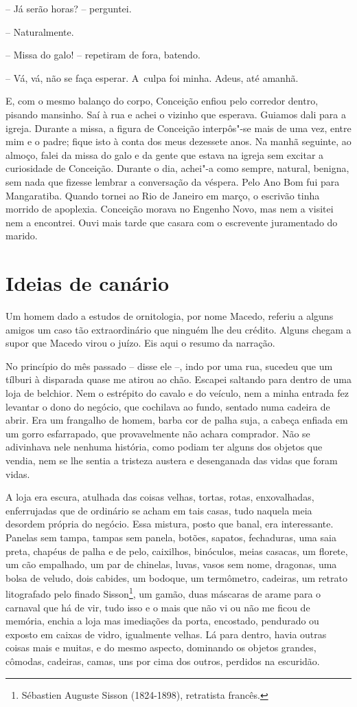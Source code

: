 -- Já serão horas? -- perguntei.

-- Naturalmente.

-- Missa do galo! -- repetiram de fora, batendo.

-- Vá, vá, não se faça esperar. A~culpa foi minha. Adeus, até amanhã.

E, com o mesmo balanço do corpo, Conceição enfiou pelo corredor dentro,
pisando mansinho. Saí à rua e achei o vizinho que esperava. Guiamos dali
para a igreja. Durante a missa, a figura de Conceição interpôs"-se mais
de uma vez, entre mim e o padre; fique isto à conta dos meus dezessete
anos. Na manhã seguinte, ao almoço, falei da missa do galo e da gente
que estava na igreja sem excitar a curiosidade de Conceição. Durante o
dia, achei"-a como sempre, natural, benigna, sem nada que fizesse lembrar
a conversação da véspera. Pelo Ano Bom fui para Mangaratiba. Quando
tornei ao Rio de Janeiro em março, o escrivão tinha morrido de
apoplexia. Conceição morava no Engenho Novo, mas nem a visitei nem a
encontrei. Ouvi mais tarde que casara com o escrevente juramentado do
marido.

\chapter{Ideias de canário}

Um homem dado a estudos de ornitologia, por nome Macedo, referiu a
alguns amigos um caso tão extraordinário que ninguém lhe deu crédito.
Alguns chegam a supor que Macedo virou o juízo. Eis aqui o resumo da
narração.

No princípio do mês passado -- disse ele --, indo por uma rua, sucedeu
que um tílburi à disparada quase me atirou ao chão. Escapei saltando
para dentro de uma loja de belchior. Nem o estrépito do cavalo e do
veículo, nem a minha entrada fez levantar o dono do negócio, que
cochilava ao fundo, sentado numa cadeira de abrir. Era um frangalho de
homem, barba cor de palha suja, a cabeça enfiada em um gorro
esfarrapado, que provavelmente não achara comprador. Não se adivinhava
nele nenhuma história, como podiam ter alguns dos objetos que vendia,
nem se lhe sentia a tristeza austera e desenganada das vidas que foram
vidas.

A loja era escura, atulhada das coisas velhas, tortas, rotas,
enxovalhadas, enferrujadas que de ordinário se acham em tais casas, tudo
naquela meia desordem própria do negócio. Essa mistura, posto que banal,
era interessante. Panelas sem tampa, tampas sem panela, botões, sapatos,
fechaduras, uma saia preta, chapéus de palha e de pelo, caixilhos,
binóculos, meias casacas, um florete, um cão empalhado, um par de
chinelas, luvas, vasos sem nome, dragonas, uma bolsa de veludo, dois
cabides, um bodoque, um termômetro, cadeiras, um retrato litografado
pelo finado Sisson\footnote{Sébastien Auguste Sisson (1824-1898),
  retratista francês.}, um gamão, duas máscaras de arame para o carnaval
que há de vir, tudo isso e o mais que não vi ou não me ficou de memória,
enchia a loja mas imediações da porta, encostado, pendurado ou exposto
em caixas de vidro, igualmente velhas. Lá para dentro, havia outras
coisas mais e muitas, e do mesmo aspecto, dominando os objetos grandes,
cômodas, cadeiras, camas, uns por cima dos outros, perdidos na
escuridão.

